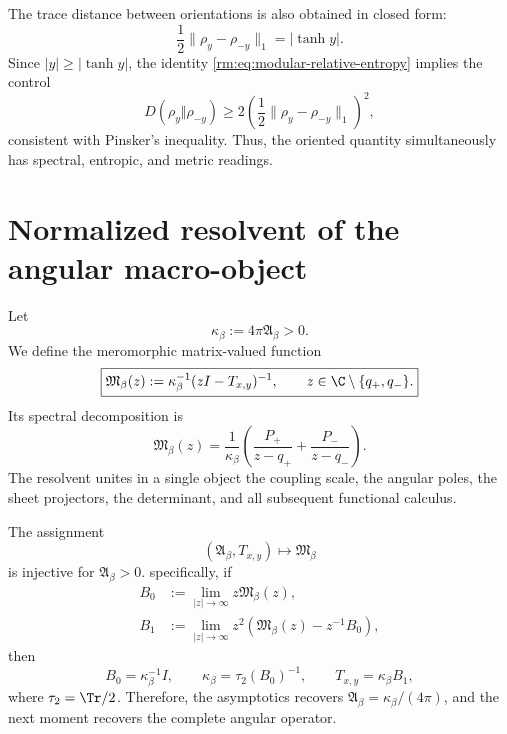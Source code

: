 The trace distance between orientations is also obtained in
closed form:
\begin{equation}
 \frac12\lVert\rho_y-\rho_{-y}\rVert_1=|\tanh y|.
 \label{rm:eq:modular-trace-distance}
\end{equation}
Since \(|y|\geq|\tanh y|\), the identity
\cref{rm:eq:modular-relative-entropy} implies the control
\begin{equation}
 D(\rho_y\Vert\rho_{-y})
 \geq 2\left(\frac12
 \lVert\rho_y-\rho_{-y}\rVert_1\right)^2,
 \label{rm:eq:modular-pinsker-exact-control}
\end{equation}
consistent with Pinsker's inequality. Thus, the oriented quantity simultaneously has
spectral, entropic, and metric readings.

\section{Normalized resolvent of the angular macro-object}

Let
\begin{equation}
 \kappa_\beta:=4\pi\mathfrak A_\beta>0.
 \label{rm:eq:modular-kappa-beta}
\end{equation}
We define the meromorphic matrix-valued function
\begin{equation}
 \boxed{
 \mathfrak M_\beta(z)
 :=\kappa_\beta^{-1}(zI-T_{x,y})^{-1},
 \qquad
 z\in\C\setminus\{q_+,q_-\}.}
 \label{rm:eq:modular-resolvent}
\end{equation}
Its spectral decomposition is
\begin{equation}
 \mathfrak M_\beta(z)
 =\frac1{\kappa_\beta}
 \left(\frac{P_+}{z-q_+}+\frac{P_-}{z-q_-}\right).
 \label{rm:eq:modular-resolvent-spectral}
\end{equation}
The resolvent unites in a single object the coupling scale, the angular
poles, the sheet projectors, the determinant, and all subsequent functional
calculus.

\begin{theorem}
\label{rm:thm:modular-resolvent-injective}
The assignment
\[
 (\mathfrak A_\beta,T_{x,y})
 \longmapsto\mathfrak M_\beta
\]
is injective for \(\mathfrak A_\beta>0\). specifically, if
\begin{align}
 B_0&:=\lim_{|z|\to\infty}z\mathfrak M_\beta(z),
 \label{rm:eq:modular-B0}\\
 B_1&:=\lim_{|z|\to\infty}z^2
 \left(\mathfrak M_\beta(z)-z^{-1}B_0\right),
 \label{rm:eq:modular-B1}
\end{align}
then
\begin{equation}
 B_0=\kappa_\beta^{-1}I,
 \qquad
 \kappa_\beta=\tau_2(B_0)^{-1},
 \qquad
 T_{x,y}=\kappa_\beta B_1,
 \label{rm:eq:modular-reconstruct-kappa-T}
\end{equation}
where \(\tau_2=\Tr/2\). Therefore, the asymptotics recovers
\(\mathfrak A_\beta=\kappa_\beta/(4\pi)\), and the next moment recovers
the complete angular operator.
\end{theorem}

